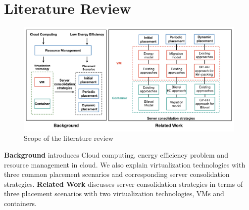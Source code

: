 \chapter{Literature Review}\label{C:background}

\begin{figure}[H]
	\centering
	\includegraphics[width=\textwidth]{pics/scope.png}
	\caption{Scope of the literature review}
	\label{fig:scope}
\end{figure}

\textbf{Background} introduces Cloud computing, energy efficiency problem and resource management in cloud. We also explain virtualization technologies  with three common placement scenarios and corresponding server consolidation strategies. \textbf{Related Work} discusses server consolidation strategies in terms of three placement scenarios with two virtualization technologies, VMs and containers.



